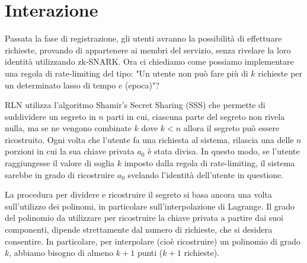 \section{Interazione}
Passata la fase di registrazione, gli utenti avranno la possibilità di effettuare richieste, provando di appartenere ai
membri del servizio, senza rivelare la loro identità utilizzando zk-SNARK. Ora ci chiediamo come possiamo implementare una regola di
rate-limiting del tipo: "Un utente non può fare più di $k$ richieste per un determinato lasso di tempo $e$ (epoca)"?

RLN utilizza l'algoritmo Shamir's Secret Sharing (SSS) che permette di suddividere un segreto in $n$ parti in cui,
ciascuna parte del segreto non rivela nulla, ma se ne vengono combinate $k$ dove $k < n$ allora il segreto può essere
ricostruito. Ogni volta che l'utente fa una richiesta al sistema, rilascia una delle $n$ porzioni in cui la sua chiave
privata $a_0$ è stata divisa. In questo modo, se l'utente raggiungesse il valore di soglia $k$ imposto dalla regola di
rate-limiting, il sistema sarebbe in grado di ricostruire $a_0$ svelando l'identità dell'utente in questione.

La procedura per dividere e ricostruire il segreto si basa ancora una volta sull'utilizzo dei polinomi, in particolare
sull'interpolazione di Lagrange. Il grado del polinomio da utilizzare per ricostruire la chiave privata a partire dai
suoi componenti, dipende strettamente dal numero di richieste, che si desidera consentire. In particolare, per interpolare
(cioè ricostruire) un polinomio di grado $k$, abbiamo bisogno di almeno $k+1$ punti ($k+1$ richieste).

